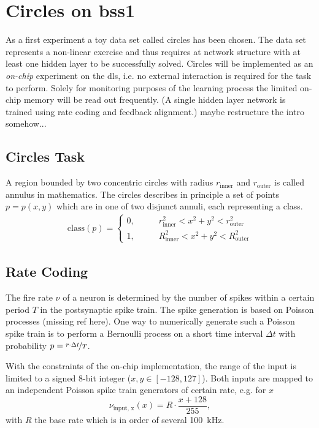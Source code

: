 \section{Circles on \gls{bss1}}
As a first experiment a toy data set called circles has been chosen. The data set represents a non-linear exercise and thus requires at network structure with at least one hidden layer to be successfully solved. Circles will be implemented as an \textit{on-chip} experiment on the \gls{dls}, i.e. no external interaction is required for the task to perform. Solely for monitoring purposes of the learning process the limited on-chip memory will be read out frequently. (A single hidden layer network is trained using rate coding and feedback alignment.) maybe restructure the intro somehow...

\subsection{Circles Task}
A region bounded by two concentric circles with radius $r_{\text{inner}}$ and $r_{\text{outer}}$ is called annulus in mathematics. The circles describes in principle a set of points $p = p(x,y)$ which are in one of two disjunct annuli, each representing a class.
\begin{align}
\text{class}(p) =
\begin{cases}
0 ,&\quad \quad r_{\text{inner}}^2 < x^2 + y^2 < r_{\text{outer}}^2 \\
1 ,&\quad \quad R_{\text{inner}}^2 < x^2 + y^2 < R_{\text{outer}}^2
\end{cases}
\end{align}

\subsection{Rate Coding}
The fire rate $\nu$ of a neuron is determined by the number of spikes within a certain period $T$ in the postsynaptic spike train. The spike generation is based on Poisson processes (missing ref here). One way to numerically generate such a Poisson spike train is to perform a Bernoulli process on a short time interval $\Delta t$ with probability $p = \nicefrac{r \cdot \Delta t}{T}$.

With the constraints of the on-chip implementation, the range of the input is limited to a signed 8-bit integer ($x, y \in [-128,127]$). Both inputs are mapped to an independent Poisson spike train generators of certain rate, e.g. for $x$
\begin{equation}\label{key}
\nu_{\text{input, x}}(x) = R \cdot \frac{x + 128}{255},
\end{equation}
with $R$ the base rate which is in order of several \SI{100}{\kilo \Hz}. 

